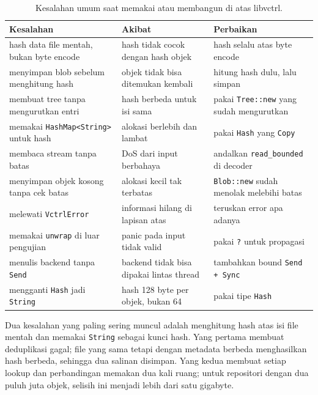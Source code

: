 \documentclass[11pt,a4paper]{article}
\begin{document}
\begin{table}[H]
	\centering
	\caption{Kesalahan umum saat memakai atau membangun di atas libvctrl.}
	\label{tab:mistakes}
	\footnotesize
	\begin{tabularx}{\textwidth}{l X X}
		\toprule
		Kesalahan                                    & Akibat                                   & Perbaikan                                       \\
		\midrule
		hash data file mentah, bukan byte encode     & hash tidak cocok dengan hash objek       & hash selalu atas byte encode                    \\
		menyimpan blob sebelum menghitung hash       & objek tidak bisa ditemukan kembali       & hitung hash dulu, lalu simpan                   \\
		membuat tree tanpa mengurutkan entri         & hash berbeda untuk isi sama              & pakai \texttt{Tree::new} yang sudah mengurutkan \\
		memakai \texttt{HashMap<String>} untuk hash  & alokasi berlebih dan lambat              & pakai \texttt{Hash} yang \texttt{Copy}          \\
		membaca stream tanpa batas                   & DoS dari input berbahaya                 & andalkan \texttt{read\_bounded} di decoder      \\
		menyimpan objek kosong tanpa cek batas       & alokasi kecil tak terbatas               & \texttt{Blob::new} sudah menolak melebihi batas \\
		melewati \texttt{VctrlError}                 & informasi hilang di lapisan atas         & teruskan error apa adanya                       \\
		memakai \texttt{unwrap} di luar pengujian    & panic pada input tidak valid             & pakai \texttt{?} untuk propagasi                \\
		menulis backend tanpa \texttt{Send}          & backend tidak bisa dipakai lintas thread & tambahkan bound \texttt{Send + Sync}            \\
		mengganti \texttt{Hash} jadi \texttt{String} & hash 128 byte per objek, bukan 64        & pakai tipe \texttt{Hash}                        \\
		\bottomrule
	\end{tabularx}
\end{table}

Dua kesalahan yang paling sering muncul adalah menghitung hash atas isi file mentah dan memakai \texttt{String} sebagai kunci hash. Yang pertama membuat deduplikasi gagal; file yang sama tetapi dengan metadata berbeda menghasilkan hash berbeda, sehingga dua salinan disimpan. Yang kedua membuat setiap lookup dan perbandingan memakan dua kali ruang; untuk repositori dengan dua puluh juta objek, selisih ini menjadi lebih dari satu gigabyte.
\end{document}
